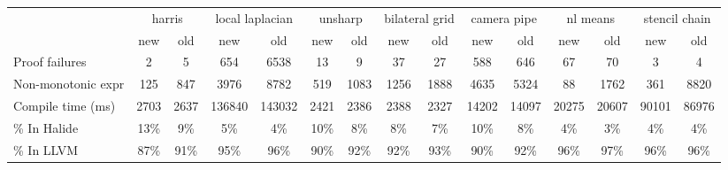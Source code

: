 ﻿%
\begin{tabular}{l|cc|cc|cc|cc|cc|cc|cc|}
& \multicolumn{2}{c|}{harris}  & \multicolumn{2}{c|}{local laplacian}  & \multicolumn{2}{c|}{unsharp}  & \multicolumn{2}{c|}{bilateral grid}  & \multicolumn{2}{c|}{camera pipe}  & \multicolumn{2}{c|}{nl means}  & \multicolumn{2}{c|}{stencil chain}  \\
& new & old & new & old & new & old & new & old & new & old & new & old & new & old\\\hline
Proof failures & 2 & 5 & 654 & 6538 & 13 & 9 & 37 & 27 & 588 & 646 & 67 & 70 & 3 & 4\\
Non-monotonic expr & 125 & 847 & 3976 & 8782 & 519 & 1083 & 1256 & 1888 & 4635 & 5324 & 88 & 1762 & 361 & 8820\\\hline
Compile time (ms) & 2703 & 2637 & 136840 & 143032 & 2421 & 2386 & 2388 & 2327 & 14202 & 14097 & 20275 & 20607 & 90101 & 86976\\
\% In Halide & 13\% & 	9\% & 	5\% & 	4\% & 	10\% & 	8\% & 	8\% & 	7\% & 	10\% & 	8\% & 	4\% & 	3\% & 	4\% & 	4\%\\
\% In LLVM & 87\% & 	91\% & 	95\% & 	96\% & 	90\% & 	92\% & 	92\% & 	93\% & 	90\% & 	92\% & 	96\% & 	97\% & 	96\% & 	96\%\\
\end{tabular}

